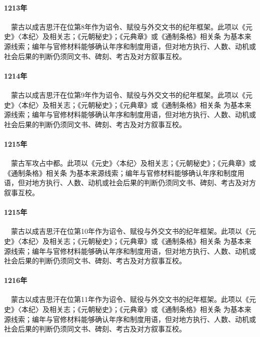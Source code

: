 \paragraph{1213年}　蒙古以成吉思汗在位第8年作为诏令、赋役与外交文书的纪年框架。此项以《元史》〈本纪〉及相关志；《元朝秘史》；《元典章》或《通制条格》相关条 为基本来源线索；编年与官修材料能够确认年序和制度用语，但对地方执行、人数、动机或社会后果的判断仍须同文书、碑刻、考古及对方叙事互校。

\paragraph{1214年}　蒙古以成吉思汗在位第9年作为诏令、赋役与外交文书的纪年框架。此项以《元史》〈本纪〉及相关志；《元朝秘史》；《元典章》或《通制条格》相关条 为基本来源线索；编年与官修材料能够确认年序和制度用语，但对地方执行、人数、动机或社会后果的判断仍须同文书、碑刻、考古及对方叙事互校。

\paragraph{1215年}　蒙古军攻占中都。此项以《元史》〈本纪〉及相关志；《元朝秘史》；《元典章》或《通制条格》相关条 为基本来源线索；编年与官修材料能够确认年序和制度用语，但对地方执行、人数、动机或社会后果的判断仍须同文书、碑刻、考古及对方叙事互校。

\paragraph{1215年}　蒙古以成吉思汗在位第10年作为诏令、赋役与外交文书的纪年框架。此项以《元史》〈本纪〉及相关志；《元朝秘史》；《元典章》或《通制条格》相关条 为基本来源线索；编年与官修材料能够确认年序和制度用语，但对地方执行、人数、动机或社会后果的判断仍须同文书、碑刻、考古及对方叙事互校。

\paragraph{1216年}　蒙古以成吉思汗在位第11年作为诏令、赋役与外交文书的纪年框架。此项以《元史》〈本纪〉及相关志；《元朝秘史》；《元典章》或《通制条格》相关条 为基本来源线索；编年与官修材料能够确认年序和制度用语，但对地方执行、人数、动机或社会后果的判断仍须同文书、碑刻、考古及对方叙事互校。

